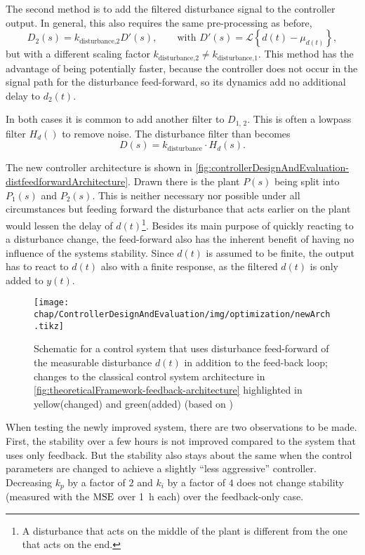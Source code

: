 The second method is to add the filtered disturbance signal to the controller output. \cite{Foellinger2016,electronics7100223} In general, this also requires the same pre-processing as before,
\begin{equation}
D_2(s)=k_\text{disturbance,2} D'(s),\qquad \text{with } D'(s)=\mathcal{L}\left\{d(t)-\mu_{d(t)}\right\},
\end{equation}
but with a different scaling factor $k_\text{disturbance,2} \neq k_\text{disturbance,1}$. This method has the advantage of being potentially faster, because the controller does not occur in the signal path for the disturbance feed-forward, so its dynamics add no additional delay to $d_2(t)$.

In both cases it is common to add another filter to $D_{1,\,2}$. This is often a lowpass filter $H_d()$ to remove noise. The disturbance filter than becomes
\begin{equation}
D(s) = k_\text{disturbance} \cdot H_d(s).
\end{equation}

The new controller architecture is shown in \autoref{fig:controllerDesignAndEvaluation-distfeedforwardArchitecture}. Drawn there is the plant $P(s)$ being split into $P_1(s)$ and $P_2(s)$. This is neither necessary nor possible under all circumstances but feeding forward the disturbance that acts earlier on the plant would lessen the delay of $d(t)$\footnote{A disturbance that acts on the middle of the plant is different from the one that acts on the end.}. Besides its main purpose of quickly reacting to a disturbance change, the feed-forward also has the inherent benefit of having no influence of the systems stability. Since $d(t)$ is assumed to be finite, the output has to react to $d(t)$ also with a finite response, as the filtered $d(t)$ is only added to $y(t)$.

\begin{figure}[tb]
	\centering
	\texttt{[image: chap/ControllerDesignAndEvaluation/img/optimization/newArch.tikz]}
	\caption{Schematic for a control system that uses disturbance feed-forward of the measurable disturbance $d(t)$ in addition to the feed-back loop; changes to the classical control system architecture in \autoref{fig:theoreticalFramework-feedback-architecture} highlighted in yellow(changed) and green(added) (based on \cite[p.~221]{Foellinger2016})}
	\label{fig:controllerDesignAndEvaluation-distfeedforwardArchitecture}
\end{figure}

When testing the newly improved system, there are two observations to be made. First, the stability over a few hours is not improved compared to the system that uses only feedback. But the stability also stays about the same when the control parameters are changed to achieve a slightly ``less aggressive'' controller. Decreasing $k_p$ by a factor of $2$ and $k_i$ by a factor of $4$ does not change stability (measured with the $\operatorname{MSE}$ over \SI{1}{\hour} each) over the feedback-only case.


